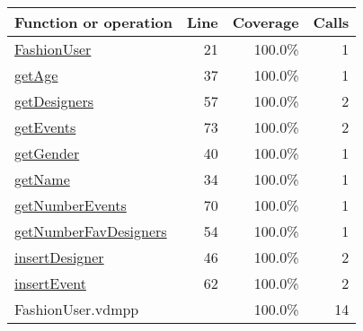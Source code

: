 \bigskip
\begin{longtable}{|l|r|r|r|}
\hline
Function or operation & Line & Coverage & Calls \\
\hline
\hline
\hyperref[FashionUser:21]{FashionUser} & 21&100.0\% & 1 \\
\hline
\hyperref[getAge:37]{getAge} & 37&100.0\% & 1 \\
\hline
\hyperref[getDesigners:57]{getDesigners} & 57&100.0\% & 2 \\
\hline
\hyperref[getEvents:73]{getEvents} & 73&100.0\% & 2 \\
\hline
\hyperref[getGender:40]{getGender} & 40&100.0\% & 1 \\
\hline
\hyperref[getName:34]{getName} & 34&100.0\% & 1 \\
\hline
\hyperref[getNumberEvents:70]{getNumberEvents} & 70&100.0\% & 1 \\
\hline
\hyperref[getNumberFavDesigners:54]{getNumberFavDesigners} & 54&100.0\% & 1 \\
\hline
\hyperref[insertDesigner:46]{insertDesigner} & 46&100.0\% & 2 \\
\hline
\hyperref[insertEvent:62]{insertEvent} & 62&100.0\% & 2 \\
\hline
\hline
FashionUser.vdmpp & & 100.0\% & 14 \\
\hline
\end{longtable}

